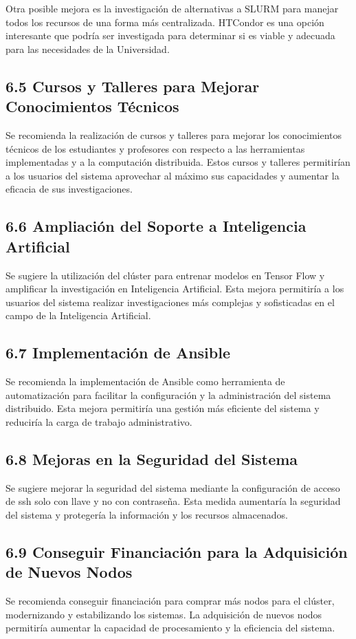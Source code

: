 \begin{spacing}{1.5}
  Otra posible mejora es la investigación de alternativas a SLURM para manejar todos los recursos de una forma más centralizada. HTCondor es una opción interesante que podría ser investigada para determinar si es viable y adecuada para las necesidades de la Universidad.

  \subsection{6.5 Cursos y Talleres para Mejorar Conocimientos Técnicos}

  Se recomienda la realización de cursos y talleres para mejorar los conocimientos técnicos de los estudiantes y profesores con respecto a las herramientas implementadas y a la computación distribuida. Estos cursos y talleres permitirían a los usuarios del sistema aprovechar al máximo sus capacidades y aumentar la eficacia de sus investigaciones.

  \subsection{6.6 Ampliación del Soporte a Inteligencia Artificial}

  Se sugiere la utilización del clúster para entrenar modelos en Tensor Flow y amplificar la investigación en Inteligencia Artificial. Esta mejora permitiría a los usuarios del sistema realizar investigaciones más complejas y sofisticadas en el campo de la Inteligencia Artificial.

  \subsection{6.7 Implementación de Ansible}

  Se recomienda la implementación de Ansible como herramienta de automatización para facilitar la configuración y la administración del sistema distribuido. Esta mejora permitiría una gestión más eficiente del sistema y reduciría la carga de trabajo administrativo.

  \subsection{6.8 Mejoras en la Seguridad del Sistema}

  Se sugiere mejorar la seguridad del sistema mediante la configuración de acceso de ssh solo con llave y no con contraseña. Esta medida aumentaría la seguridad del sistema y protegería la información y los recursos almacenados.

  \subsection{6.9 Conseguir Financiación para la Adquisición de Nuevos Nodos}

  Se recomienda conseguir financiación para comprar más nodos para el clúster, modernizando y estabilizando los sistemas. La adquisición de nuevos nodos permitiría aumentar la capacidad de procesamiento y la eficiencia del sistema.
  \begin{tightcenter}
  \end{tightcenter}
\end{spacing}